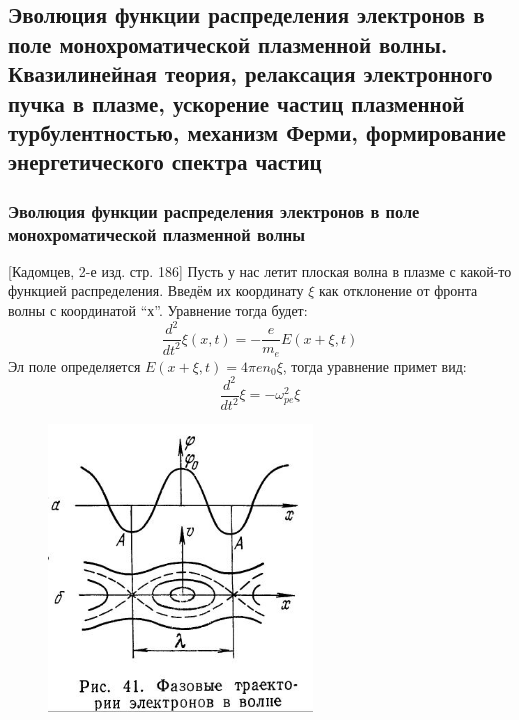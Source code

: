 \documentclass[10pt, a4paper]{article}
\begin{document}
\subsection{Эволюция функции распределения электронов в поле монохроматической плазменной волны. Квазилинейная теория, релаксация электронного пучка в плазме, ускорение частиц 	плазменной турбулентностью, механизм Ферми, формирование энергетического спектра частиц}
\subsubsection{Эволюция функции распределения электронов в поле монохроматической плазменной волны}
[Кадомцев, 2-е изд. стр. 186]
Пусть у нас летит плоская волна в плазме с какой-то функцией распределения. Введём их координату $\xi$ как отклонение от фронта волны с координатой “х”.
Уравнение тогда будет:
\begin{equation}
	\frac{d^2}{dt^{2}} \xi (x,t) = - \frac{e}{m_e} E(x+\xi,t)
\end{equation}
Эл поле определяется $E(x+\xi,t)=4 \pi e n_0 \xi$, тогда уравнение примет вид:
\begin{equation}
	\frac{d^2}{dt^{2}} \xi = - \omega^{2}_{pe} \xi
\end{equation}

\begin{figure}[h!]
	\begin{center}
		\includegraphics[width=70mm]{zatuh_landau_nonlinear_1.JPG}
	\end{center}
\end{figure}
\end{document}

